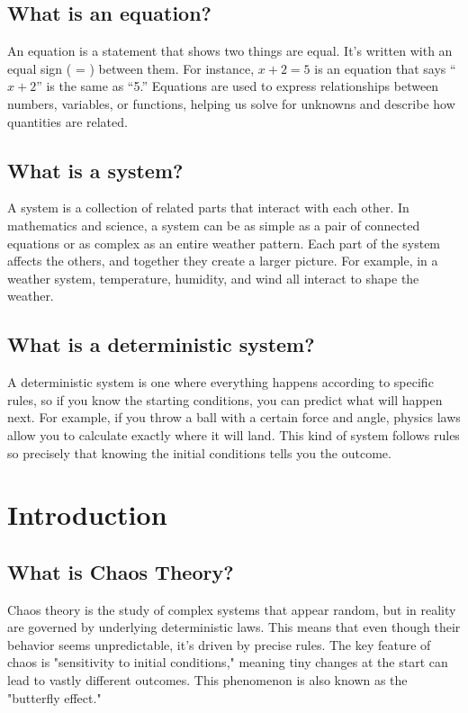 \documentclass[12pt]{article}
\begin{document}
\subsection{What is an equation?}
An equation is a statement that shows two things are equal. It’s written with an equal sign ( = ) between them. For instance, \( x + 2 = 5 \) is an equation that says “\( x + 2 \)” is the same as “5.” Equations are used to express relationships between numbers, variables, or functions, helping us solve for unknowns and describe how quantities are related.

\subsection{What is a system?}
A system is a collection of related parts that interact with each other. In mathematics and science, a system can be as simple as a pair of connected equations or as complex as an entire weather pattern. Each part of the system affects the others, and together they create a larger picture. For example, in a weather system, temperature, humidity, and wind all interact to shape the weather.

\subsection{What is a deterministic system?}
A deterministic system is one where everything happens according to specific rules, so if you know the starting conditions, you can predict what will happen next. For example, if you throw a ball with a certain force and angle, physics laws allow you to calculate exactly where it will land. This kind of system follows rules so precisely that knowing the initial conditions tells you the outcome.

\section{Introduction}

\subsection{What is Chaos Theory?}
Chaos theory is the study of complex systems that appear random, but in reality are governed by underlying deterministic laws. This means that even though their behavior seems unpredictable, it's driven by precise rules. The key feature of chaos is "sensitivity to initial conditions," meaning tiny changes at the start can lead to vastly different outcomes. This phenomenon is also known as the "butterfly effect."
\end{document}
